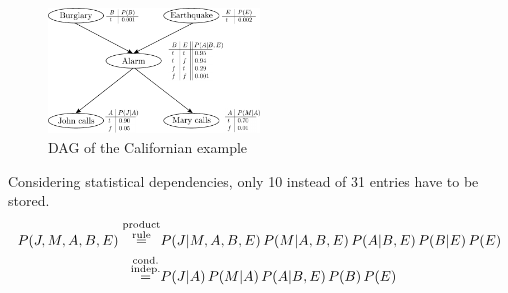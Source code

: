 \begin{frame} \frametitle{\subsubsecname}

	\begin{figure}[h]
		 \centering
		 \includegraphics[width=0.5\textwidth]{img/section3_fig5_v2_2}%
		 \caption{DAG of the Californian example}
	\end{figure}
	
Considering statistical dependencies, only 10 instead of 31 entries have to be stored.
	{ \small
		\begin{align} 
			P(J,M,A,B,E) \stackrel{\substack{\text{product}\\\text{rule}}}{=}& 
			P(J|M,A,B,E) \, P(M|A,B,E) \, P(A|B,E) \, P(B|E) \, P(E) \\\slidesonly{\vspace{-5mm}}
			\stackrel{\substack{\text{cond.}\\\text{indep.}}}{=}& P(J|A) \, P(M|A) \, P(A|B,E) \, P(B) \, P(E)
		\end{align}
	}
\end{frame}


